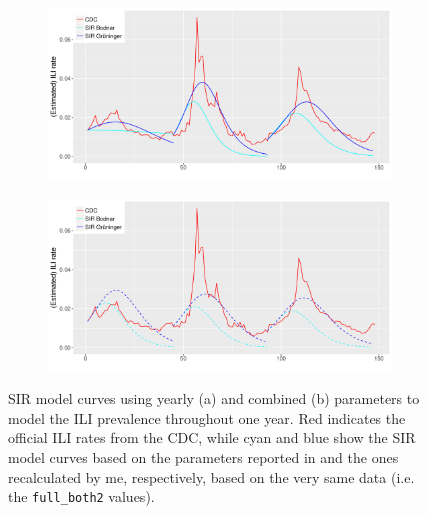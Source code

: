 \documentclass[11pt, a4paper,twoside]{report}\usepackage[]{graphicx}\usepackage[]{color}
\begin{document}
\begin{figure}[htbp!]
\centering
  \begin{subfigure}[t]{1\textwidth}
  \includegraphics[width=1\linewidth]{40A_SIR_model_full_model_25_comparison_yearly.pdf}
  \caption{}
  \end{subfigure}
  
  \begin{subfigure}[t]{1\textwidth}
  \includegraphics[width=1\linewidth]{40B_SIR_model_full_model_25_comparison_combined.pdf}
  \caption{}
  \end{subfigure}
  \caption{SIR model curves using yearly (a) and combined (b) parameters to model the ILI prevalence throughout one year. Red indicates the official ILI rates from the CDC, while cyan and blue show the SIR model curves based on the parameters reported in \cite{bodnar_data_2015} and the ones recalculated by me, respectively, based on the very same data (i.e. the \texttt{full\_both2} values).}
  \label{fig:40A_40B_remodeling_comparison}
\end{figure}
\end{document}
